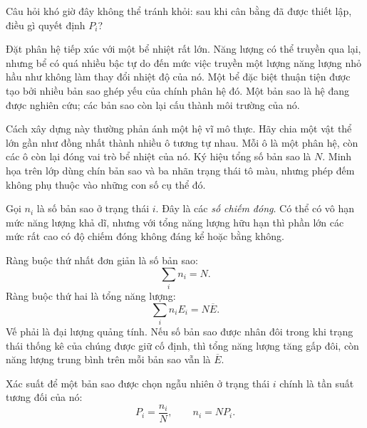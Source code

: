 Câu hỏi khó giờ đây không thể tránh khỏi: sau khi cân bằng đã được thiết
lập, điều gì quyết định \(P_i\)?

Đặt phân hệ tiếp xúc với một bể nhiệt rất lớn. Năng lượng có thể truyền qua
lại, nhưng bể có quá nhiều bậc tự do đến mức việc truyền một lượng năng lượng
nhỏ hầu như không làm thay đổi nhiệt độ của nó. Một bể đặc biệt thuận tiện
được tạo bởi nhiều bản sao ghép yếu của chính phân hệ đó. Một bản sao là hệ
đang được nghiên cứu; các bản sao còn lại cấu thành môi trường của nó.

Cách xây dựng này thường phản ánh một hệ vĩ mô thực. Hãy chia một vật thể
lớn gần như đồng nhất thành nhiều ô tương tự nhau. Mỗi ô là một phân hệ, còn
các ô còn lại đóng vai trò bể nhiệt của nó. Ký hiệu tổng số bản sao là \(N\).
Minh họa trên lớp dùng chín bản sao và ba nhãn trạng thái tô màu, nhưng phép
đếm không phụ thuộc vào những con số cụ thể đó.

Gọi \(n_i\) là số bản sao ở trạng thái \(i\). Đây là các
\emph{số chiếm đóng}. Có thể có vô hạn mức năng lượng khả dĩ, nhưng với tổng năng lượng hữu hạn thì phần lớn các mức rất cao có độ chiếm đóng không đáng kể hoặc bằng không.

Ràng buộc thứ nhất đơn giản là số bản sao:
\begin{equation}
 \sum_i n_i=N.
 \label{eq:sm3-number-constraint}
\end{equation}
Ràng buộc thứ hai là tổng năng lượng:
\begin{equation}
 \sum_i n_iE_i=N\overline E.
 \label{eq:sm3-total-energy-constraint}
\end{equation}
Vế phải là đại lượng quảng tính. Nếu số bản sao được nhân đôi trong khi trạng thái thống kê của chúng được giữ cố định, thì tổng năng lượng tăng gấp đôi, còn năng lượng trung bình trên mỗi bản sao vẫn là \(\overline E\).

\begin{classroomqa}
\end{classroomqa}

Xác suất để một bản sao được chọn ngẫu nhiên ở trạng thái \(i\) chính là tần suất tương đối của nó:
\begin{equation}
 P_i=\frac{n_i}{N},
 \qquad
 n_i=NP_i.
 \label{eq:sm3-frequency-probability}
\end{equation}

